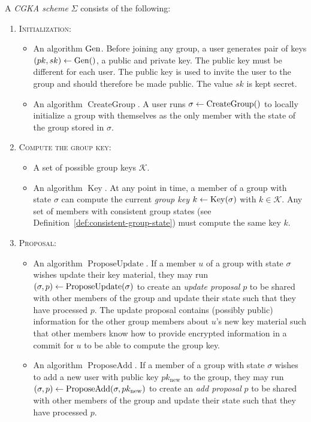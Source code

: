 \begin{definition}[CGKA]
	A \emph{CGKA scheme} $\Sigma$ consists of the following:
	\begin{enumerate}[1.]
		\item[] \textsc{Initialization:}
			\begin{itemize}
				\item An algorithm $\mathrm{Gen}$. Before joining any group, a user generates pair of keys $(pk, sk) \leftarrow \mathrm{Gen}()$, a public and private key. The public key must be different for each user. The public key is used to invite the user to the group and should therefore be made public. The value $sk$ is kept secret.
				\item An algorithm $\operatorname{CreateGroup}$. A user runs $\sigma \leftarrow \operatorname{CreateGroup}()$ to locally initialize a group with themselves as the only member with the state of the group stored in $\sigma$.
			\end{itemize}
		\item[] \textsc{Compute the group key:}
			\begin{itemize}
				\item A set of possible group keys $\mathcal{K}$.
				\item An algorithm $\operatorname{Key}$. At any point in time, a member of a group with state $\sigma$ can compute the current \emph{group key} $k \leftarrow \operatorname{Key}(\sigma)$ with $k \in \mathcal{K}$. Any set of members with consistent group states (see Definition~\vref{def:consistent-group-state}) must compute the same key $k$.
			\end{itemize}
		\item[] \textsc{Proposal:}
			\begin{itemize}
				\item An algorithm $\operatorname{ProposeUpdate}$. If a member $u$ of a group with state $\sigma$ wishes update their key material, they may run $(\sigma, p) \leftarrow \operatorname{ProposeUpdate}(\sigma)$ to create an \emph{update proposal} $p$ to be shared with other members of the group and update their state such that they have processed $p$. The update proposal contains (possibly public) information for the other group members about $u$'s new key material such that other members know how to provide encrypted information in a commit for $u$ to be able to compute the group key.
				\item An algorithm $\operatorname{ProposeAdd}$. If a member of a group with state $\sigma$ wishes to add a new user with public key $pk_{\mathrm{new}}$ to the group, they may run $(\sigma, p) \leftarrow \operatorname{ProposeAdd}(\sigma, pk_{\mathrm{new}})$ to create an \emph{add proposal} $p$ to be shared with other members of the group and update their state such that they have processed $p$.

\end{itemize}
\end{enumerate}
\end{definition}
